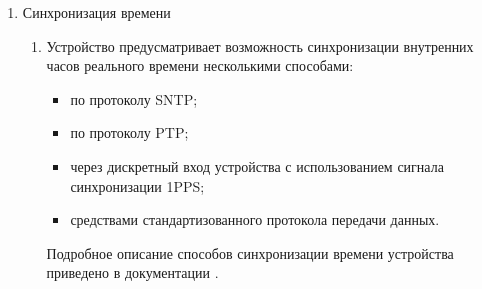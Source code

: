 \begin{enumerate}[label=\arabic{section}.\arabic{subsection}.\arabic*, labelsep=7pt, leftmargin=0pt, itemindent=60pt, align=left]
\item Синхронизация времени
\begin{enumerate}
\item Устройство предусматривает возможность синхронизации внутренних часов реального времени несколькими способами:
\begin{itemize}
\item по протоколу SNTP;
\item по протоколу PTP;
\item через дискретный вход устройства с использованием сигнала синхронизации 1PPS;
\item средствами стандартизованного протокола передачи данных.
\end{itemize}
Подробное описание способов синхронизации времени устройства приведено в документации \ManualUnitGeneral.
\end{enumerate}


\end{enumerate}
